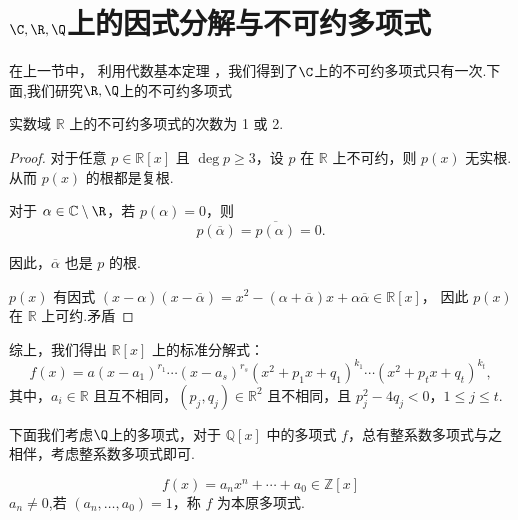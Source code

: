 \section{$\C,\R,\Q$上的因式分解与不可约多项式}
在上一节中， 利用代数基本定理 ，我们得到了$\C$上的不可约多项式只有一次.下面,我们研究$\R,\Q$上的不可约多项式
\begin{proposition}
	实数域 $\mathbb{R}$ 上的不可约多项式的次数为 1 或 2.
\end{proposition}
\begin{proof}
	对于任意 $ p \in \mathbb{R}[x] $ 且 $ \deg p \geqslant 3 $，设 $ p $ 在 $\mathbb{R}$ 上不可约，则 $ p(x) $ 无实根.从而 $ p(x) $ 的根都是复根.
	
	对于 $ \alpha \in \mathbb{C}\setminus\R $，若 $ p(\alpha) = 0 $，则
	$$
	p(\overline{\alpha}) = \overline{p(\alpha)} = 0.
	$$
	
	因此，$ \overline{\alpha }$ 也是 $ p $ 的根.
	
	$ p(x) $ 有因式 $ (x - \alpha)(x - \overline{\alpha}) = x^2 - (\alpha + \overline{\alpha})x + \alpha \overline{\alpha} \in \mathbb{R}[x] $，
	因此 $ p(x) $ 在 $\mathbb{R}$ 上可约.矛盾
	
\end{proof}

综上，我们得出 $\mathbb{R}[x]$ 上的标准分解式：
$$
f(x) = a (x - a_1)^{r_1} \cdots (x - a_s)^{r_s} (x^2 + p_1 x + q_1)^{k_1} \cdots (x^2 + p_t x + q_t)^{k_t},
$$
其中，$ a_i \in \mathbb{R} $ 且互不相同，$ (p_j, q_j) \in \mathbb{R}^2 $ 且不相同，且 $ p_j^2 - 4 q_j < 0 $，$ 1 \leq j \leq t $.

下面我们考虑$\Q$上的多项式，对于 \( \mathbb{Q}[x] \) 中的多项式 \( f \)，总有整系数多项式与之相伴，考虑整系数多项式即可.
\begin{definition}\label{p1:concept:c1-l1154}
	$$ f(x) = a_n x^n + \cdots + a_0 \in \mathbb{Z}[x]$$\( \)\( a_n \neq 0 \),若 \( (a_n, \ldots, a_0) = 1 \)，称 \( f \) 为本原多项式.
\end{definition}

